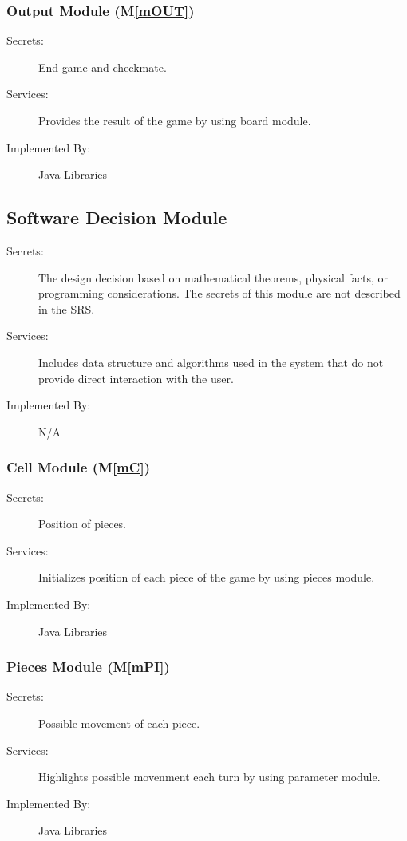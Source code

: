 \documentclass[12pt, titlepage]{article}
\newcommand{\mref}[1]{M\ref{#1}}
\begin{document}
\subsubsection{Output Module (\mref{mOUT})}
\begin{description}
\item[Secrets:] End game and checkmate.
\item[Services:]Provides the result of the game by using board module.
\item[Implemented By:] Java Libraries
\end{description}



\subsection{Software Decision Module}

\begin{description}
\item[Secrets:] The design decision based on mathematical theorems, physical
  facts, or programming considerations. The secrets of this module are
  not described in the SRS.
\item[Services:] Includes data structure and algorithms used in the system that
  do not provide direct interaction with the user. 
\item[Implemented By:] N/A
\end{description}

\subsubsection{Cell Module (\mref{mC})}

\begin{description}
\item[Secrets:] Position of pieces.
\item[Services:]Initializes position of each piece of the game by using pieces module.
\item[Implemented By:] Java Libraries
\end{description}

\subsubsection{Pieces Module (\mref{mPI})}

\begin{description}
\item[Secrets:] Possible movement of each piece.
\item[Services:] Highlights possible movenment each turn by using parameter module.
\item[Implemented By:] Java Libraries
\end{description}
\end{document}
